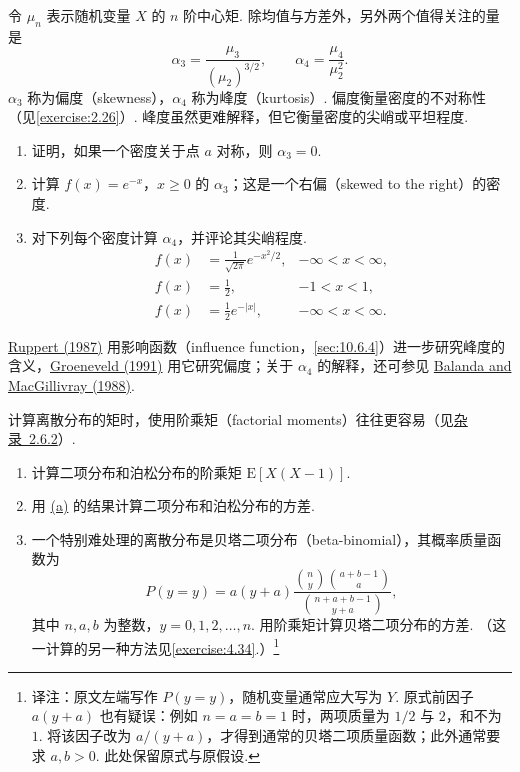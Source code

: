\begin{exercise}\label{exercise:2.28}
令 $\mu_n$ 表示随机变量 $X$ 的 $n$ 阶中心矩. 除均值与方差外，另外两个值得关注的量是
$$\alpha_3=\frac{\mu_3}{(\mu_2)^{3/2}},\qquad\alpha_4=\frac{\mu_4}{\mu_2^2}.$$
$\alpha_3$ 称为偏度（skewness），$\alpha_4$ 称为峰度（kurtosis）. 偏度衡量密度的不对称性（见\autoref{exercise:2.26}）. 峰度虽然更难解释，但它衡量密度的尖峭或平坦程度.
\begin{enumerate}
\item[(a)] 证明，如果一个密度关于点 $a$ 对称，则 $\alpha_3=0$.
\item[(b)] 计算 $f(x)=e^{-x}$，$x\ge0$ 的 $\alpha_3$；这是一个右偏（skewed to the right）的密度.
\item[(c)] 对下列每个密度计算 $\alpha_4$，并评论其尖峭程度.
$$\begin{aligned}
f(x)&=\frac1{\sqrt{2\pi}}e^{-x^2/2},&-\infty<x<\infty,\\
f(x)&=\frac12,&-1<x<1,\\
f(x)&=\frac12e^{-|x|},&-\infty<x<\infty.
\end{aligned}$$
\end{enumerate}
\hyperref[bib:source268]{Ruppert (1987)} 用影响函数（influence function，\autoref{sec:10.6.4}）进一步研究峰度的含义，\hyperref[bib:source152]{Groeneveld (1991)} 用它研究偏度；关于 $\alpha_4$ 的解释，还可参见 \hyperref[bib:source6]{Balanda and MacGillivray (1988)}.
\end{exercise}
\begin{exercise}\label{exercise:2.29}
计算离散分布的矩时，使用阶乘矩（factorial moments）往往更容易（见\hyperref[sec:2.6.2]{杂录~2.6.2}）.
\begin{enumerate}
\item[(a)]\label{itm:exercise:2.29:a} 计算二项分布和泊松分布的阶乘矩 $\mathrm E[X(X-1)]$.
\item[(b)] 用 \hyperref[itm:exercise:2.29:a]{(a)} 的结果计算二项分布和泊松分布的方差.
\item[(c)] 一个特别难处理的离散分布是贝塔二项分布（beta-binomial），其概率质量函数为
$$P(y=y)=a(y+a)\frac{\binom ny\binom{a+b-1}a}{\binom{n+a+b-1}{y+a}},$$
其中 $n,a,b$ 为整数，$y=0,1,2,\ldots,n$. 用阶乘矩计算贝塔二项分布的方差. （这一计算的另一种方法见\autoref{exercise:4.34}.）\footnote{译注：原文左端写作 $P(y=y)$，随机变量通常应大写为 $Y$. 原式前因子 $a(y+a)$ 也有疑误：例如 $n=a=b=1$ 时，两项质量为 $1/2$ 与 $2$，和不为 $1$. 将该因子改为 $a/(y+a)$，才得到通常的贝塔二项质量函数；此外通常要求 $a,b>0$. 此处保留原式与原假设.}
\end{enumerate}
\end{exercise}
